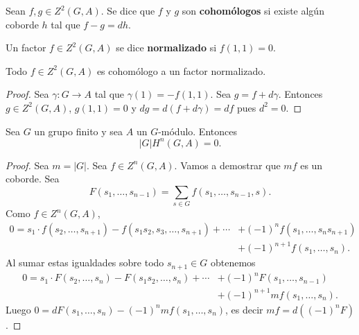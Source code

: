 
\begin{definition}
	Sean $f,g\in Z^2(G,A)$. Se dice que $f$ y $g$ son \textbf{cohomólogos} si
	existe algún coborde $h$ tal que $f-g=dh$. 
\end{definition}

Un factor $f\in Z^2(G,A)$ se dice \textbf{normalizado} si $f(1,1)=0$. 

\begin{lemma}
	\label{lemma:normalizado}
	Todo $f\in Z^2(G,A)$ es cohomólogo a un factor normalizado. 
\end{lemma}

\begin{proof}
	Sea $\gamma\colon G\to A$ tal que $\gamma(1)=-f(1,1)$. Sea
	$g=f+d\gamma$. Entonces $g\in Z^2(G,A)$, $g(1,1)=0$ y $dg=d(f+d\gamma)=df$ pues
	$d^2=0$. 
\end{proof}

\begin{theorem}
	\label{theorem:|G|H^2=0}
	Sea $G$ un grupo finito y sea $A$ un $G$-módulo. Entonces 
	\[
	|G|H^n(G,A)=0.
	\]
\end{theorem}

\begin{proof}
	Sea $m=|G|$. Sea $f\in Z^n(G,A)$. Vamos a demostrar que $mf$ es un coborde. Sea 
	\[
	F(s_1,\dots,s_{n-1})=\sum_{s\in G}f(s_1,\dots,s_{n-1},s).
	\]
	Como $f\in Z^n(G,A)$, 
	\begin{align*}
		0=s_1\cdot f(s_2,\dots,s_{n+1})-f(s_1s_2,s_3,\dots,s_{n+1})+\cdots&+(-1)^nf(s_1,\dots,s_ns_{n+1})\\
		&+(-1)^{n+1}f(s_1,\dots,s_n).
	\end{align*}
	Al sumar estas igualdades sobre todo $s_{n+1}\in G$ obtenemos 
	\begin{align*}
		0=s_1\cdot F(s_2,\dots,s_n)-F(s_1s_2,\dots,s_n)+\cdots&+(-1)^nF(s_1,\dots,s_{n-1})\\
		&+(-1)^{n+1}mf(s_1,\dots,s_n).
	\end{align*}
	Luego $0=dF(s_1,\dots,s_n)-(-1)^nmf(s_1,\dots,s_n)$, es decir $mf=d(
	(-1)^nF)$.
\end{proof}

